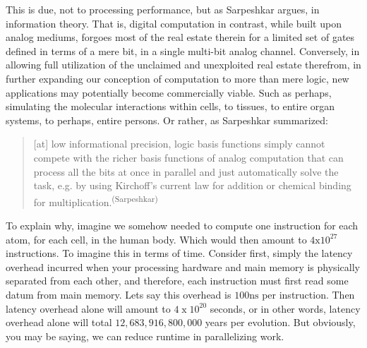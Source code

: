 This is due, not to processing performance, but as Sarpeshkar argues, in information theory. That is, digital computation in contrast, while built upon analog mediums, forgoes most of the real estate therein for a limited set of gates defined in terms of a mere bit, in a single multi-bit analog channel. Conversely, in allowing full utilization of the unclaimed and unexploited real estate therefrom, in further expanding our conception of computation to more than mere logic, new applications may potentially become commercially viable. Such as perhaps, simulating the molecular interactions within cells, to tissues, to entire organ systems, to perhaps, entire persons. Or rather, as Sarpeshkar summarized:

\begin{quotation}
    [at] low informational precision, logic basis functions simply cannot compete with the richer basis functions of analog computation that can process all the bits at once in parallel and just automatically solve the task, e.g. by using Kirchoff’s current law for addition or chemical binding for multiplication.\textsuperscript{(Sarpeshkar)}
\end{quotation}



To explain why, imagine we somehow needed to compute one instruction for each atom, for each cell, in the human body. Which would then amount to $4 \mathrm{x} 10^{27}$ instructions. To imagine this in terms of time. Consider first, simply the latency overhead incurred when your processing hardware and main memory is physically separated from each other, and therefore, each instruction must first read some datum from main memory. Lets say this overhead is $100\mathrm{ns}$ per instruction. Then latency overhead alone will amount to $4\;\mathrm{x}\;10^{20}$ seconds, or in other words, latency overhead alone will total $12,683,916,800,000$ years per evolution. But obviously, you may be saying, we can reduce runtime in parallelizing work.


